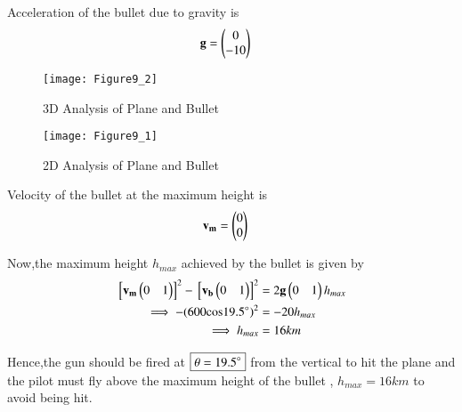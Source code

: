 \documentclass[journal,12pt,twocolumn]{IEEEtran}
\begin{document}
Acceleration of the bullet due to gravity is
\begin{align}
    \mathbf{g} &= \begin{pmatrix}0 \\ -10\end{pmatrix}
\end{align}

\begin{figure}[!ht]
\centering
\texttt{[image: Figure9\_2]}
\caption{3D Analysis of Plane and Bullet}
\label{fig:3D}	
\end{figure}

\begin{figure}[!ht]
\centering
\texttt{[image: Figure9\_1]}
\caption{2D Analysis of Plane and Bullet}
\label{fig:2D}	
\end{figure}

Velocity of the bullet at the maximum height is
\begin{align}
    \mathbf{v_m} &= \begin{pmatrix}0 \\ 0\end{pmatrix}
\end{align}

Now,the maximum height $h_{max}$ achieved by the bullet is given by
\begin{align}
    {}\left[\mathbf{v_m}\begin{pmatrix}0 & 1\end{pmatrix}\right]^2- {}\left[\mathbf{v_b}\begin{pmatrix}0 & 1\end{pmatrix}\right]^2 &= 2\mathbf{g}\begin{pmatrix}0 & 1\end{pmatrix}h_{max} 
    \\
    \implies -(600\text{cos}19.5\degree)^2 &= -20h_{max}
    \\
    \implies h_{max} &= 16 km
\end{align}

Hence,the gun should be fired at $\boxed{\theta=19.5\degree}$ from the vertical to hit the plane and the pilot must fly above the maximum height of the bullet , $\boxed{h_{max} = 16 km}$ to avoid being hit.
\end{document}
